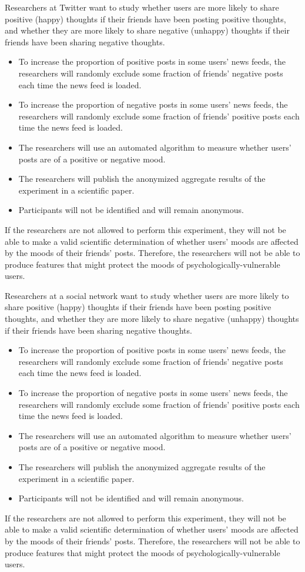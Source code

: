Researchers at Twitter want to study whether users are more likely to share positive (happy) thoughts if their friends have been posting positive thoughts, and whether they are more likely to share negative (unhappy) thoughts if their friends have been sharing negative thoughts.
\begin{itemize}
\item To increase the proportion of positive posts in some users' news feeds, the researchers will randomly exclude some fraction of friends' negative posts each time the news feed is loaded.
\item To increase the proportion of negative posts in some users' news feeds, the researchers will randomly exclude some fraction of friends' positive posts each time the news feed is loaded.
\item The researchers will use an automated algorithm to measure whether users' posts are of a positive or negative mood.
\item The researchers will publish the anonymized aggregate results of the experiment in a scientific paper.
\item Participants will not be identified and will remain anonymous.
\end{itemize}
If the researchers are not allowed to perform this experiment, they will not be able to make a valid scientific determination of whether users' moods are affected by the moods of their friends' posts. Therefore, the researchers will not be able to produce features that might protect the moods of psychologically-vulnerable users.




Researchers at a social network want to study whether users are more likely to share positive (happy) thoughts if their friends have been posting positive thoughts, and whether they are more likely to share negative (unhappy) thoughts if their friends have been sharing negative thoughts.
\begin{itemize}
\item To increase the proportion of positive posts in some users' news feeds, the researchers will randomly exclude some fraction of friends' negative posts each time the news feed is loaded.
\item To increase the proportion of negative posts in some users' news feeds, the researchers will randomly exclude some fraction of friends' positive posts each time the news feed is loaded.
\item The researchers will use an automated algorithm to measure whether users' posts are of a positive or negative mood.
\item The researchers will publish the anonymized aggregate results of the experiment in a scientific paper.
\item Participants will not be identified and will remain anonymous.
\end{itemize}
If the researchers are not allowed to perform this experiment, they will not be able to make a valid scientific determination of whether users' moods are affected by the moods of their friends' posts. Therefore, the researchers will not be able to produce features that might protect the moods of psychologically-vulnerable users.




